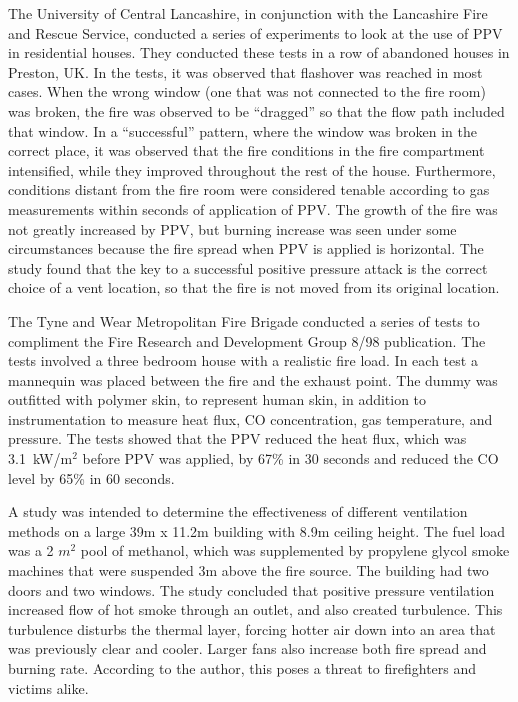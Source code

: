 \documentclass{article}
\begin{document}
\begin{appendices}
The University of Central Lancashire, in conjunction with the Lancashire Fire and Rescue Service, conducted a series of experiments to look at the use of PPV in residential houses. They conducted these tests in a row of abandoned houses in Preston, UK. In the tests, it was observed that flashover was reached in most cases. When the wrong window (one that was not connected to the fire room) was broken, the fire was observed to be “dragged” so that the flow path included that window. In a “successful” pattern, where the window was broken in the correct place, it was observed that the fire conditions in the fire compartment intensified, while they improved throughout the rest of the house. Furthermore, conditions distant from the fire room were considered tenable according to gas measurements within seconds of application of PPV. The growth of the fire was not greatly increased by PPV, but burning increase was seen under some circumstances because the fire spread when PPV is applied is horizontal. The study found that the key to a successful positive pressure attack is the correct choice of a vent location, so that the fire is not moved from its original location.\cite{StottApplyingpressure}
	
The Tyne and Wear Metropolitan Fire Brigade conducted a series of tests to compliment the Fire Research and Development Group 8/98 publication. The tests involved a three bedroom house with a realistic fire load. In each test a mannequin was placed between the fire and the exhaust point. The dummy was outfitted with polymer skin, to represent human skin, in addition to instrumentation to measure heat flux, CO concentration, gas temperature, and pressure.  The tests showed that the PPV reduced the heat flux, which was 3.1~kW/m$^{2}$ before PPV was applied, by 67\% in 30 seconds and reduced the CO level by 65\% in 60 seconds.\cite{TurpinBowserNatPerspective}
	
A study was intended to determine the effectiveness of different ventilation methods on a large 39m x 11.2m building with 8.9m ceiling height. The fuel load was a 2 $m^{2}$ pool of methanol, which was supplemented by propylene glycol smoke machines that were suspended 3m above the fire source.  The building had two doors and two windows. The study concluded that positive pressure ventilation increased flow of hot smoke through an outlet, and also created turbulence. This turbulence disturbs the thermal layer, forcing hotter air down into an area that was previously clear and cooler. Larger fans also increase both fire spread and burning rate. According to the author, this poses a threat to firefighters and victims alike.\cite{SvenssonFireVentinLargeFireHall}
	

\end{appendices}
\end{document}
